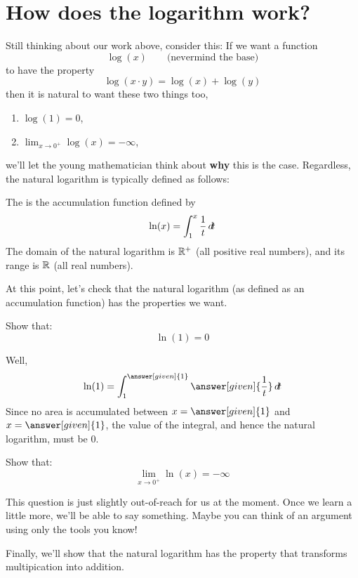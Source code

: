 \documentclass{ximera}
\begin{document}
\section{How does the logarithm work?}

Still thinking about our work above, consider this: If we want a function
\[
\log(x)\qquad\text{(nevermind the base)}
\]
to have the property
\[
\log(x\cdot y) = \log(x) + \log(y)
\]
then it is natural to want these two things too,
\begin{enumerate}
\item $\log(1) =0$,
\item $\lim_{x\to 0^+}\log(x) = -\infty$,
\end{enumerate}
we'll let the young mathematician think about \textbf{why} this is the
case. Regardless, the natural logarithm is typically defined as follows:

\begin{definition}
  The  is the accumulation function defined by
  \[
  \ln(x) = \int_1^x \frac{1}{t} \mathop{}\!d\! t
  \]
  The domain of the natural logarithm is $\mathbb R^+$ (all positive real numbers),
  and its range is $\mathbb R$ (all real numbers). 
\end{definition}

At this point, let's check that the natural logarithm (as defined as
an accumulation function) has the properties we want. 

\begin{example}
  Show that:
  \[
  \ln(1) = 0
  \]
  \begin{explanation}
    Well, 
    \[
    \ln(1) = \int_1^{\answer[given]{1}} \answer[given]{\frac{1}{t}} \d t
    \]
    Since no area is accumulated between $x=\answer[given]{1}$ and
    $x=\answer[given]{1}$, the value of the integral, and hence the
    natural logarithm, must be $0$.
  \end{explanation}
\end{example}

\begin{example}
  Show that:
  \[
  \lim_{x\to 0^+}\ln(x) = -\infty
  \]
  \begin{explanation}
    This question is just slightly out-of-reach for us at the
    moment. Once we learn a little more, we'll be able to say something.
    Maybe you can think of an argument using only the tools you know!
  \end{explanation}
\end{example}

Finally, we'll show that the natural logarithm has the property that
transforms multipication into addition.
\end{document}
